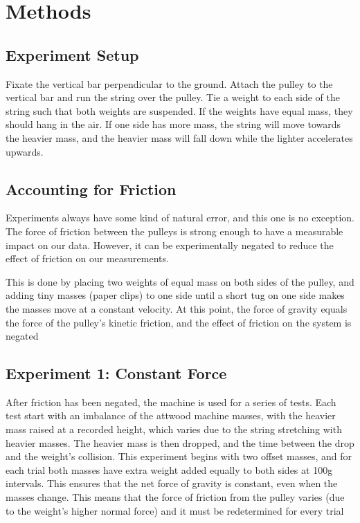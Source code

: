 \documentclass[12pt]{article}
\begin{document}
    \section{Methods}
        \subsection{Experiment Setup}
            Fixate the vertical bar perpendicular to the ground. Attach the 
            pulley to the vertical bar and run the string over the pulley.
            Tie a weight to each side of the string such that both weights are
            suspended. If the weights have equal mass, they should hang in the
            air. If one side has more mass, the string will move towards the
            heavier mass, and the heavier mass will fall down while the lighter
            accelerates upwards. 
        \subsection{Accounting for Friction}
            \par Experiments always have some kind of natural error, and this one
            is no exception. The force of friction between the pulleys is
            strong enough to have a measurable impact on our data.
            However, it can be experimentally negated to
            reduce the effect of friction on our measurements.
            \par This is done by placing two weights of equal mass on both sides
            of the pulley, and adding tiny masses (paper clips) to one side until
            a short tug on one side makes the masses move at a constant velocity.
            At this point, the force of gravity equals the force of the pulley's 
            kinetic friction, and the effect of friction on the system is
            negated

        \subsection{Experiment 1: Constant Force}
            After friction has been negated, the machine is used for a series of
            tests. Each test start with an imbalance of the attwood machine masses,
            with the heavier mass raised at a recorded height, which varies due to
            the string stretching with heavier masses. The heavier mass is
            then dropped, and the time between the drop and the weight's collision.
            This experiment begins with two offset masses, and for each trial
            both masses have extra weight added equally to both sides at 100g
            intervals. This ensures that the net force of gravity is constant,
            even when the masses change. This means that the force of friction 
            from the pulley varies (due to the weight's higher normal force)
            and it must be redetermined for every trial
\end{document}
